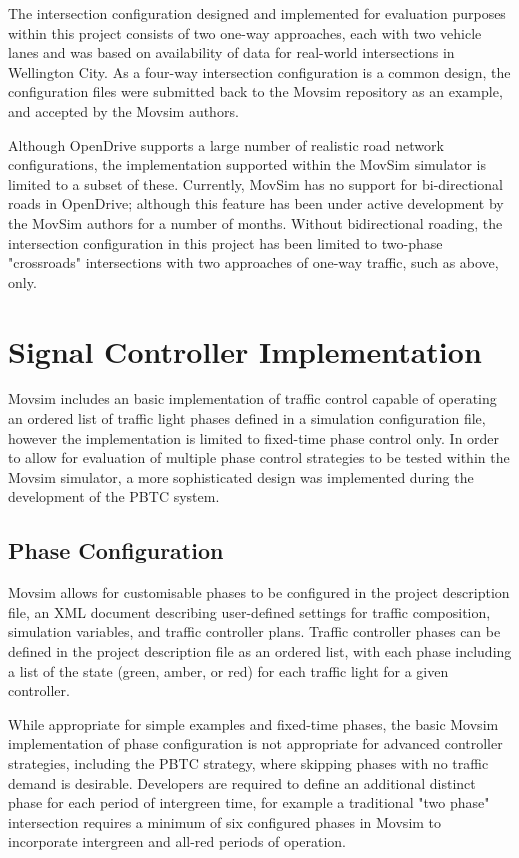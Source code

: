 The intersection configuration designed and implemented for evaluation purposes within this project consists of two one-way approaches, each with two vehicle lanes and was based on availability of data for real-world intersections in Wellington City. As a four-way intersection configuration is a common design, the configuration files were submitted back to the Movsim repository as an example, and accepted by the Movsim authors. 


Although OpenDrive supports a large number of realistic road network configurations, the implementation supported within the MovSim simulator is limited to a subset of these. Currently, MovSim has no support for bi-directional roads in OpenDrive; although this feature has been under active development by the MovSim authors for a number of months. Without bidirectional roading, the intersection configuration in this project has been limited to two-phase "crossroads" intersections with two approaches of one-way traffic, such as above, only. 

\section{Signal Controller Implementation}

Movsim includes an basic implementation of traffic control capable of operating an ordered list of traffic light phases defined in a simulation configuration file, however the implementation is limited to fixed-time phase control only. In order to allow for evaluation of multiple phase control strategies to be tested within the Movsim simulator, a more sophisticated design was implemented during the development of the PBTC system.

\subsection{Phase Configuration}

Movsim allows for customisable phases to be configured in the project description file, an XML document describing user-defined settings for traffic composition, simulation variables, and traffic controller plans. Traffic controller phases can be defined in the project description file as an ordered list, with each phase including a list of the state (green, amber, or red) for each traffic light for a given controller. 

While appropriate for simple examples and fixed-time phases, the basic Movsim implementation of phase configuration is not appropriate for advanced controller strategies, including the PBTC strategy, where skipping phases with no traffic demand is desirable. Developers are required to define an additional distinct phase for each period of intergreen time, for example a traditional "two phase" intersection requires a minimum of six configured phases in Movsim to incorporate intergreen and all-red periods of operation.

